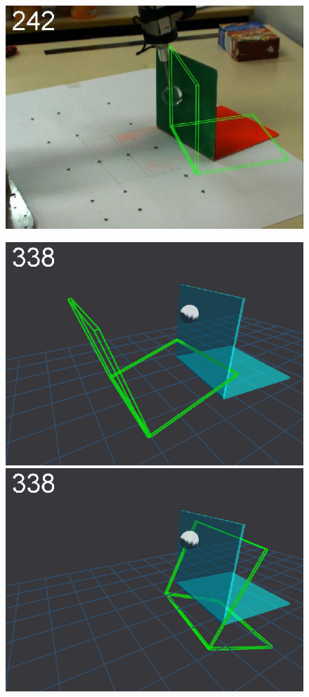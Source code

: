 \begin{figure}[tb]
{\includegraphics[width=\imgBXwid]{images/B2_2exp_38_4}
}
\centerline{
\includegraphics[width=\imgBXwid]{images/B1_1exp_20_5}
\includegraphics[width=\imgBXwid]{images/B1_2exp_20_5}
}
\end{figure}
